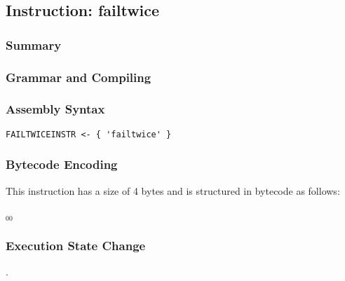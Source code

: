\subsection{Instruction: failtwice}

\subsubsection{Summary}


\subsubsection{Grammar and Compiling}


\subsubsection{Assembly Syntax}

\begin{myquote}
\begin{verbatim}
FAILTWICEINSTR <- { 'failtwice' }
\end{verbatim}
\end{myquote}

\subsubsection{Bytecode Encoding}

This instruction has a size of 4 bytes and is structured in bytecode as follows:

$_{00}$\ 


\subsubsection{Execution State Change}

.


